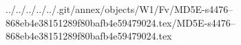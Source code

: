 ../../../../../.git/annex/objects/W1/Fv/MD5E-s4476--868eb4e38151289f80bafb4e59479024.tex/MD5E-s4476--868eb4e38151289f80bafb4e59479024.tex
